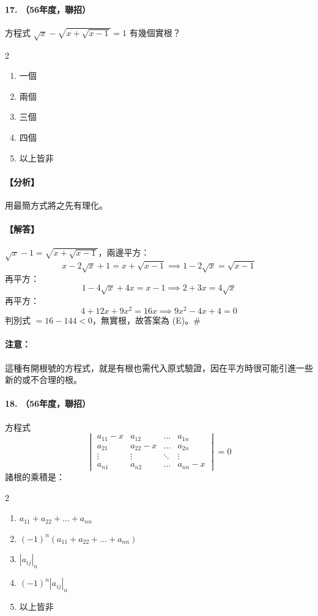 \paragraph{17. （56年度，聯招）}
方程式 $\sqrt{x} - \sqrt{x+\sqrt{x-1}} = 1$ 有幾個實根？
\begin{multicols}{2}
\begin{enumerate}[label=(\Alph*)]
  \item 一個
  \item 兩個
  \item 三個
  \item 四個
  \item 以上皆非
\end{enumerate}
\end{multicols}

\paragraph{【分析】}
用最簡方式將之先有理化。

\paragraph{【解答】}
$\sqrt{x}-1 = \sqrt{x+\sqrt{x-1}}$，兩邊平方：
\[ x - 2\sqrt{x} + 1 = x + \sqrt{x-1} \implies 1-2\sqrt{x} = \sqrt{x-1} \]
再平方：
\[ 1-4\sqrt{x}+4x = x-1 \implies 2+3x = 4\sqrt{x} \]
再平方：
\[ 4+12x+9x^2 = 16x \implies 9x^2-4x+4 = 0 \]
判別式 $= 16 - 144 < 0$，無實根，故答案為 (E)。\hfill$\#$

\paragraph{注意：} 這種有開根號的方程式，就是有根也需代入原式驗證，因在平方時很可能引進一些新的或不合理的根。

\paragraph{18. （56年度，聯招）}
方程式
\[ \begin{vmatrix}
a_{11}-x & a_{12} & \dots & a_{1n} \\
a_{21} & a_{22}-x & \dots & a_{2n} \\
\vdots & \vdots & \ddots & \vdots \\
a_{n1} & a_{n2} & \dots & a_{nn}-x
\end{vmatrix} = 0 \]
諸根的乘積是：
\begin{multicols}{2}
\begin{enumerate}[label=(\Alph*)]
  \item $a_{11}+a_{22}+\dots+a_{nn}$
  \item $(-1)^n (a_{11}+a_{22}+\dots+a_{nn})$
  \item $|a_{ij}|_n$
  \item $(-1)^n |a_{ij}|_n$
  \item 以上皆非
\end{enumerate}
\end{multicols}

